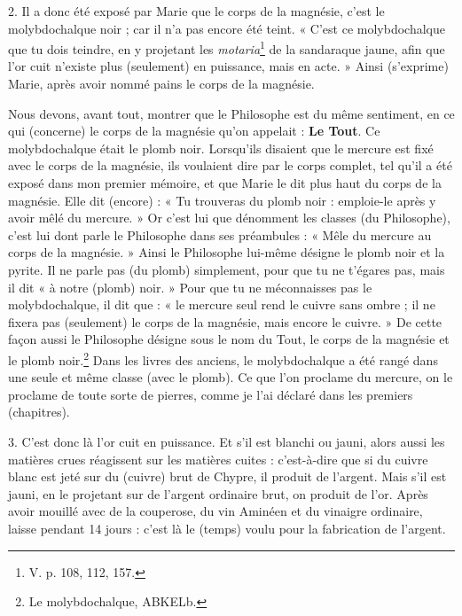 \documentclass[a4paper, 11pt, oneside, polutonikogreek, french]{article}
\begin{document}
2. Il a donc été exposé par Marie que le corps de la magnésie, c'est le molybdochalque noir ; car il n'a pas encore été teint. « C'est ce molybdochalque que tu dois teindre, en y projetant les \emph{motaria}\footnote{V. p. 108, 112, 157.} de la sandaraque jaune, afin que l'or cuit n'existe plus (seulement) en puissance, mais en acte. » Ainsi (s'exprime) Marie, après avoir nommé pains le corps de la magnésie.

Nous devons, avant tout, montrer que le Philosophe est du même sentiment, en ce qui (concerne) le corps de la magnésie qu'on appelait : \textbf{Le Tout}. Ce molybdochalque était le plomb noir. Lorsqu'ils disaient que le mercure est fixé avec le corps de la magnésie, ils voulaient dire par le corps complet, tel qu'il a été exposé dans mon premier mémoire, et que Marie le dit plus haut du corps de la magnésie. Elle dit (encore) : « Tu trouveras du plomb noir : emploie-le après y avoir mêlé du mercure. » Or c'est lui que dénomment les classes (du Philosophe), c'est lui dont parle le Philosophe dans ses préambules : « Mêle du mercure au corps de la magnésie. » Ainsi le Philosophe lui-même désigne le plomb noir et la pyrite. Il ne parle pas (du plomb) simplement, pour que tu ne t'égares pas, mais il dit « à notre (plomb) noir. » Pour que tu ne méconnaisses pas le molybdochalque, il dit que : « le mercure seul rend le cuivre sans ombre ; il ne fixera pas (seulement) le corps de la magnésie, mais encore le cuivre. » De cette façon aussi le Philosophe désigne sous le nom du Tout, le corps de la magnésie et le plomb noir.\footnote{Le molybdochalque, ABKELb.} Dans les livres des anciens, le molybdochalque a été rangé dans une seule et même classe (avec le plomb). Ce que l'on proclame du mercure, on le proclame de toute sorte de pierres, comme je l'ai déclaré dans les premiers (chapitres).

3. C'est donc là l'or cuit en puissance. Et s'il est blanchi ou jauni, alors aussi les matières crues réagissent sur les matières cuites : c'est-à-dire que si du cuivre blanc est jeté sur du (cuivre) brut de Chypre, il produit de l'argent. Mais s'il est jauni, en le projetant sur de l'argent ordinaire brut, on produit de l'or. Après avoir mouillé avec de la couperose, du vin Aminéen et du vinaigre ordinaire, laisse pendant 14 jours : c'est là le (temps) voulu pour la fabrication de l'argent.
\end{document}
